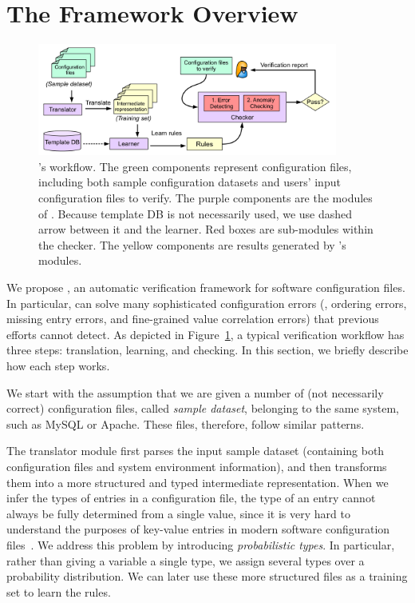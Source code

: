 
\section{The \app Framework Overview}

\begin{figure}[tbp] \centering
\includegraphics[width=0.88\textwidth]{figs/overview}
\caption{\app's workflow. The green components represent configuration 
  files, including both sample configuration datasets and users' input
  configuration files to verify. 
  The purple components are the modules of \app.
  Because template DB is not necessarily used, we use dashed
  arrow between it and the learner.
  Red boxes are sub-modules within the checker.
  The yellow components are results generated by \app's modules.}
\label{fig-overview}
\end{figure}

We propose \app, an automatic verification framework for 
software configuration files.
In particular, \app can solve many sophisticated 
configuration errors (\eg, ordering errors, missing entry errors,
and fine-grained value correlation errors) that previous efforts cannot 
detect. As depicted in Figure~\ref{fig-overview}, 
a typical \app verification workflow has three steps:
translation, learning, and checking. In this section, we briefly
describe how each step works.

We start with the assumption 
that we are given a number of (not necessarily correct) 
configuration files, called {\em sample dataset}, 
belonging to the same system, such as MySQL or Apache. 
These files, therefore, follow similar patterns.

The translator module first parses the input sample 
dataset (containing both configuration files and system environment
information), and then transforms them into a more structured
and typed intermediate representation.
When we infer the types of entries in a configuration file, 
the type of an entry cannot always be fully determined from 
a single value, since it is very hard to understand
the purposes of key-value entries in modern
software configuration files~\cite{xu15hey}.
We address this problem 
by introducing {\em probabilistic types}.
In particular, rather than giving a variable a single type, 
we assign several types over a probability distribution. 
We can later use these more structured files
as a training set to learn the rules. 

